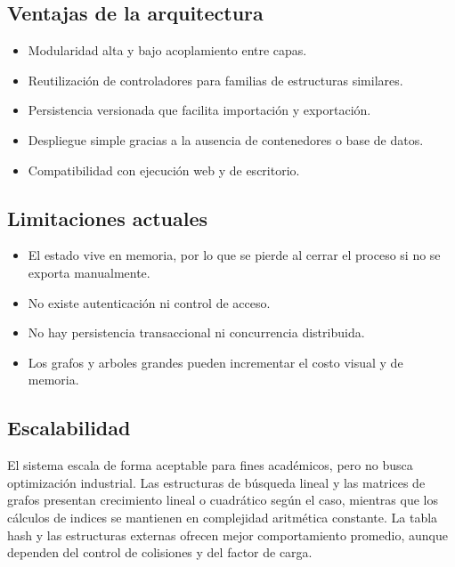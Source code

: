 \documentclass[12pt,onecolumn]{IEEEtran}
\begin{document}
\subsection{Ventajas de la arquitectura}
\begin{itemize}
  \item Modularidad alta y bajo acoplamiento entre capas.
  \item Reutilización de controladores para familias de estructuras similares.
  \item Persistencia versionada que facilita importación y exportación.
  \item Despliegue simple gracias a la ausencia de contenedores o base de datos.
  \item Compatibilidad con ejecución web y de escritorio.
\end{itemize}

\subsection{Limitaciones actuales}
\begin{itemize}
  \item El estado vive en memoria, por lo que se pierde al cerrar el proceso si no se exporta manualmente.
  \item No existe autenticación ni control de acceso.
  \item No hay persistencia transaccional ni concurrencia distribuida.
  \item Los grafos y arboles grandes pueden incrementar el costo visual y de memoria.
\end{itemize}

\subsection{Escalabilidad}
El sistema escala de forma aceptable para fines académicos, pero no busca optimización industrial. Las estructuras de búsqueda lineal y las matrices de grafos presentan crecimiento lineal o cuadrático según el caso, mientras que los cálculos de indices se mantienen en complejidad aritmética constante. La tabla hash y las estructuras externas ofrecen mejor comportamiento promedio, aunque dependen del control de colisiones y del factor de carga.
\end{document}
